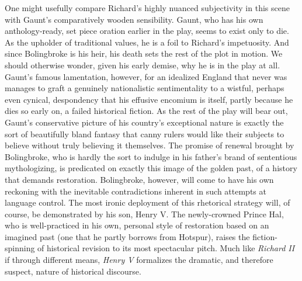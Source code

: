 One might usefully compare Richard’s highly nuanced subjectivity in this scene with Gaunt’s comparatively wooden sensibility.
Gaunt, who has his own anthology-ready, set piece oration earlier in the play, seems to exist only to die.
As the upholder of traditional values, he is a foil to Richard’s impetuosity.
And since Bolingbroke is his heir, his death sets the rest of the plot in motion.
We should otherwise wonder, given his early demise, why he is in the play at all.
Gaunt’s famous lamentation, however, for an idealized England that never was manages to graft a genuinely nationalistic sentimentality to a wistful, perhaps even cynical, despondency that his effusive encomium is itself, partly because he dies so early on, a failed historical fiction.
As the rest of the play will bear out, Gaunt’s conservative picture of his country’s exceptional nature is exactly the sort of beautifully bland fantasy that canny rulers would like their subjects to believe without truly believing it themselves.
The promise of renewal brought by Bolingbroke, who is hardly the sort to indulge in his father’s brand of sententious mythologizing, is predicated on exactly this image of the golden past, of a history that demands restoration.
Bolingbroke, however, will come to have his own reckoning with the inevitable contradictions inherent in such attempts at language control.
The most ironic deployment of this rhetorical strategy will, of course, be demonstrated by his son, Henry V.
The newly-crowned Prince Hal, who is well-practiced in his own, personal style of restoration based on an imagined past (one that he partly borrows from Hotspur), raises the fiction-spinning of historical revision to its most spectacular pitch.
Much like \emph{Richard II} if through different means, \emph{Henry V} formalizes the dramatic, and therefore suspect, nature of historical discourse.
